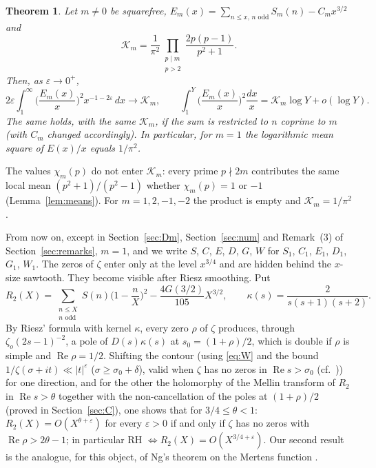 \documentclass[11pt]{amsart}
\newtheorem{theorem}{Theorem}
\theoremstyle{remark}
\newcommand{\zo}{\zeta_{o}}
\begin{document}
\begin{theorem}\label{thm:A}
Let $m\neq0$ be squarefree, $E_m(x)=\sum_{n\le x,\,n\text{ odd}}S_m(n)-C_mx^{3/2}$ and
\[
\mathcal K_m=\frac1{\pi^2}\prod_{\substack{p\mid m\\ p>2}}\frac{2p(p-1)}{p^2+1}.
\]
Then, as $\varepsilon\to0^+$,
\[
2\varepsilon\int_1^\infty\Big(\frac{E_m(x)}{x}\Big)^2x^{-1-2\varepsilon}\,dx\longrightarrow\mathcal K_m,
\qquad
\int_1^Y\Big(\frac{E_m(x)}{x}\Big)^2\frac{dx}{x}=\mathcal K_m\log Y+o(\log Y).
\]
The same holds, with the same $\mathcal K_m$, if the sum is restricted to $n$ coprime to $m$ (with $C_m$ changed accordingly). In particular, for $m=1$ the logarithmic mean square of $E(x)/x$ equals $1/\pi^2$.
\end{theorem}

The values $\chi_m(p)$ do not enter $\mathcal K_m$: every prime $p\nmid2m$ contributes the same local mean $(p^2+1)/(p^2-1)$ whether $\chi_m(p)=1$ or $-1$ (Lemma~\ref{lem:means}). For $m=1,2,-1,-2$ the product is empty and $\mathcal K_m=1/\pi^2$.

From now on, except in Section~\ref{sec:Dm}, Section~\ref{sec:num} and Remark~(3) of Section~\ref{sec:remarks}, $m=1$, and we write $S$, $C$, $E$, $D$, $G$, $W$ for $S_1$, $C_1$, $E_1$, $D_1$, $G_1$, $W_1$. The zeros of $\zeta$ enter only at the level $x^{3/4}$ and are hidden behind the $x$-size sawtooth. They become visible after Riesz smoothing. Put
\[
R_2(X)=\sum_{\substack{n\le X\\ n\text{ odd}}}S(n)\Big(1-\frac nX\Big)^2-\frac{4G(3/2)}{105}X^{3/2},\qquad \kappa(s)=\frac{2}{s(s+1)(s+2)}.
\]
By Riesz' formula with kernel $\kappa$, every zero $\rho$ of $\zeta$ produces, through $\zo(2s-1)^{-2}$, a pole of $D(s)\kappa(s)$ at $s_0=(1+\rho)/2$, which is double if $\rho$ is simple and $\operatorname{Re}\rho=1/2$. Shifting the contour (using \eqref{eq:W} and the bound $1/\zeta(\sigma+it)\ll|t|^{\varepsilon}$ ($\sigma\ge\sigma_0+\delta$), valid when $\zeta$ has no zeros in $\operatorname{Re}s>\sigma_0$ (cf.\ \cite[\S14.2]{T})) for one direction, and for the other the holomorphy of the Mellin transform of $R_2$ in $\operatorname{Re}s>\theta$ together with the non-cancellation of the poles at $(1+\rho)/2$ (proved in Section~\ref{sec:C}), one shows that for $3/4\le\theta<1$: $R_2(X)=O(X^{\theta+\varepsilon})$ for every $\varepsilon>0$ if and only if $\zeta$ has no zeros with $\operatorname{Re}\rho>2\theta-1$; in particular RH $\iff R_2(X)=O(X^{3/4+\varepsilon})$. Our second result is the analogue, for this object, of Ng's theorem on the Mertens function \cite{Ng}.
\end{document}
